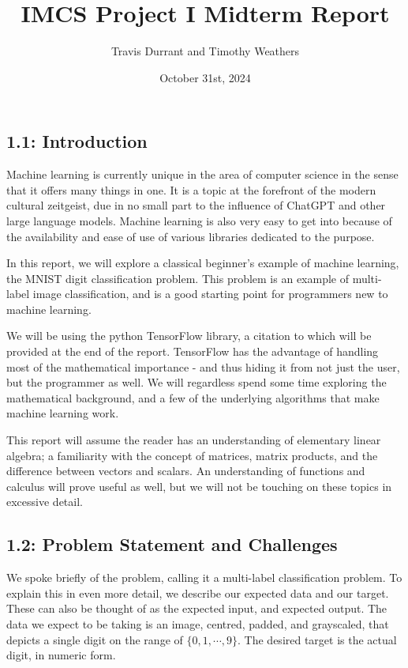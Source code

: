\documentclass{article}
\title{IMCS Project I Midterm Report}
\author{Travis Durrant and Timothy Weathers}
\date{October 31st, 2024}
\begin{document}
\maketitle
\subsection*{1.1: Introduction}
Machine learning is currently unique in the area of computer science in the sense that it offers many things in one. It is a topic at the forefront of the modern cultural zeitgeist, due in no small part to the influence of ChatGPT and other large language models. Machine learning is also very easy to get into because of the availability and ease of use of various libraries dedicated to the purpose.

In this report, we will explore a classical beginner’s example of machine learning, the MNIST digit classification problem. This problem is an example of multi-label image classification, and is a good starting point for programmers new to machine learning.

We will be using the python TensorFlow library, a citation to which will be provided at the end of the report. TensorFlow has the advantage of handling most of the mathematical importance - and thus hiding it from not just the user, but the programmer as well. We will regardless spend some time exploring the mathematical background, and a few of the underlying algorithms that make machine learning work.


This report will assume the reader has an understanding of elementary linear algebra; a familiarity with the concept of matrices, matrix products, and the difference between vectors and scalars. An understanding of functions and calculus will prove useful as well, but we will not be touching on these topics in excessive detail.
\\
\subsection*{1.2: Problem Statement and Challenges}
We spoke briefly of the problem, calling it a multi-label classification problem. To explain this in even more detail, we describe our expected data and our target. These can also be thought of as the expected input, and expected output. The data we expect to be taking is an image, centred, padded, and grayscaled, that depicts a single digit on the range of $\{0,1,\cdots,9\}$. The desired target is the actual digit, in numeric form.
\end{document}
